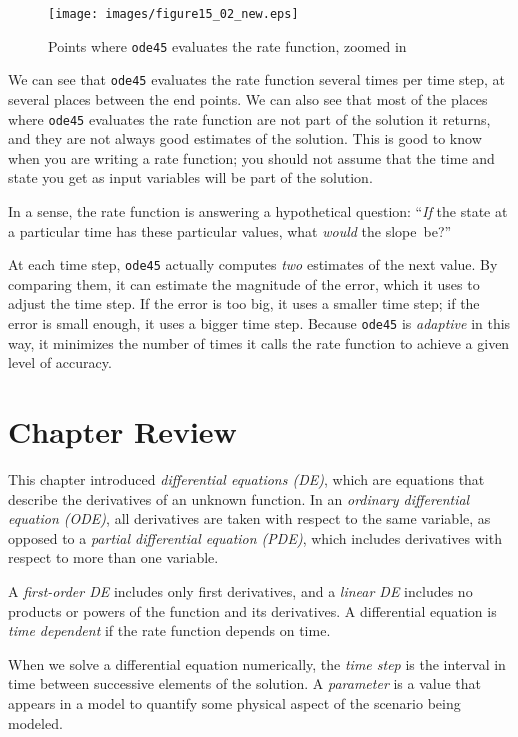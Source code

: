\begin{figure}[h]
\centerline{\texttt{[image: images/figure15\_02\_new.eps]}}
\caption{Points where \lstinline{ode45} evaluates the rate function, zoomed in}
\label{fig:odeplot2}
\end{figure}

We can see that \lstinline{ode45} evaluates the rate function several times per time step, at several places between the end points.
We can also see that most of the places where \lstinline{ode45} evaluates the rate function are not part of the solution it returns, and they are not always good estimates of the solution.
This is good to know when you are writing a rate function; you should not assume that the time and state you get as input variables will be part of the solution.

In a sense, the rate function is answering a hypothetical question: ``\emph{If} the state at a particular time has these particular values, what \emph{would} the slope~be?''


At each time step, \lstinline{ode45} actually computes \emph{two} estimates of the next value.
By comparing them, it can estimate the magnitude of the error,  which it uses to adjust the time step.
If the error is too big, it uses a smaller time step; if the error is small enough, it uses a bigger time step.
Because \lstinline{ode45} is \emph{adaptive} in this way, it minimizes the number of times it calls the rate function to achieve a given level of accuracy.




\section{Chapter Review}

This chapter introduced \emph{differential equations (DE)}, which are equations that describe the
derivatives of an unknown function.
In an \emph{ordinary differential equation (ODE)}, all derivatives are taken with
respect to the same variable, as opposed to a \emph{partial differential equation (PDE)}, which includes derivatives with respect to more than one variable.

A \emph{first-order DE} includes only first derivatives, and a \emph{linear DE} includes no products or powers of the function and its derivatives.
A differential equation is \emph{time dependent} if the rate function depends on time.

When we solve a differential equation numerically, the \emph{time step} is the interval in time between successive elements of the solution.
A \emph{parameter} is a value that appears in a model to quantify some
physical aspect of the scenario being modeled.

